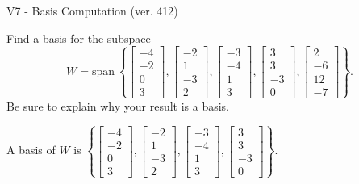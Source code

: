 \begin{exercise}
  \begin{exerciseTitle}V7 - Basis Computation (ver. 412)\end{exerciseTitle}
  \begin{exerciseStatement}
    Find a basis for the subspace 
\[W=\mathrm{span}\ \left\{\left[\begin{array}{r}
-4 \\
-2 \\
0 \\
3
\end{array}\right] , \left[\begin{array}{r}
-2 \\
1 \\
-3 \\
2
\end{array}\right] , \left[\begin{array}{r}
-3 \\
-4 \\
1 \\
3
\end{array}\right] , \left[\begin{array}{r}
3 \\
3 \\
-3 \\
0
\end{array}\right] , \left[\begin{array}{r}
2 \\
-6 \\
12 \\
-7
\end{array}\right]\right\}.\]
 Be sure to explain why your result is a basis.


  \end{exerciseStatement}
  \begin{exerciseAnswer}
   A basis of \(W\) is  \(\left\{\left[\begin{array}{r}
-4 \\
-2 \\
0 \\
3
\end{array}\right] , \left[\begin{array}{r}
-2 \\
1 \\
-3 \\
2
\end{array}\right] , \left[\begin{array}{r}
-3 \\
-4 \\
1 \\
3
\end{array}\right] , \left[\begin{array}{r}
3 \\
3 \\
-3 \\
0
\end{array}\right]\right\}\).
  


  \end{exerciseAnswer}
\end{exercise}